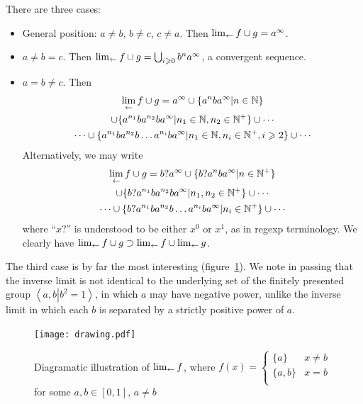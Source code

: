 \documentclass{article}
\theoremstyle{definition}
\begin{document}
There are three cases:

\begin{itemize}
\item General position: $a\neq b$, $b\neq c$, $c\neq a$.  Then
  $\lim_{\leftarrow} f\cup g=a^\infty$.
\item $a\neq b=c$.  Then $\lim_{\leftarrow} f\cup g=\bigcup_{i\geqslant
  0}b^na^\infty$, a convergent sequence.
\item $a=b\neq c$.  Then
  \begin{multline}
    \lim_{\leftarrow} f\cup g=
    a^\infty\cup
    \lbrace a^nba^\infty|n\in\mathbb{N}\rbrace\\
    \cup\lbrace a^{n_1}ba^{n_2}ba^\infty|n_1\in\mathbb{N},n_2\in\mathbb{N^+}\rbrace
    \cup\cdots\\
    \cdots\cup\lbrace a^{n_1}ba^{n_2}b\ldots a^{n_i}ba^\infty|n_1\in\mathbb{N},n_i\in\mathbb{N}^+,i\geqslant 2\rbrace
    \cup\cdots
  \end{multline}
  Alternatively, we may write
  \begin{multline}
    \lim_{\leftarrow} f\cup g=
    b?a^\infty\cup
    \lbrace b?a^nba^\infty|n\in\mathbb{N^+}\rbrace\\
    \cup\lbrace b?a^{n_1}ba^{n_2}ba^\infty|n_1,n_2\in\mathbb{N^+}\rbrace
    \cup\cdots\\
    \cdots\cup\lbrace b?a^{n_1}ba^{n_2}b\ldots a^{n_i}ba^\infty|n_i\in\mathbb{N}^+\rbrace\cup\cdots
  \end{multline}
  where ``$x?$'' is understood to be either $x^0$ or $x^1$, as in regexp terminology.
  We clearly have $\lim_{\leftarrow} f\cup g\supset\lim_{\leftarrow} f\cup\lim_{\leftarrow} g$.
\end{itemize}

The third case is by far the most interesting (figure~\ref{drawing}).
We note in passing that the inverse limit is not identical to the
underlying set of the finitely presented group $\left\langle
a,b\left|b^2=1\right.\right\rangle$, in which $a$ may have negative
power, unlike the inverse limit in which each $b$ is separated by a
strictly positive power of $a$.

\begin{figure}[h]
\centering
\texttt{[image: drawing.pdf]}
\caption[width=\textwidth]{Diagramatic illustration of 
  \label{drawing} $\lim_{\leftarrow} f$, where $f(x) = \begin{cases}
    \lbrace a\rbrace & x\neq b\\
    \lbrace a,b\rbrace & x=b\\
    \end{cases}$ for some $a,b\in[0,1]$, $a\neq b$}
\end{figure}
\end{document}
